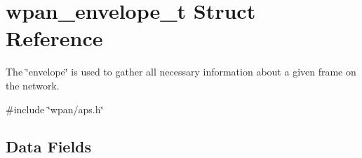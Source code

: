 \hypertarget{structwpan__envelope__t}{\section{wpan\-\_\-envelope\-\_\-t Struct Reference}
\label{structwpan__envelope__t}
}


The \char`\"{}envelope\char`\"{} is used to gather all necessary information about a given frame on the network.  




{\ttfamily \#include \char`\"{}wpan/aps.\-h\char`\"{}}

\subsection*{Data Fields}
